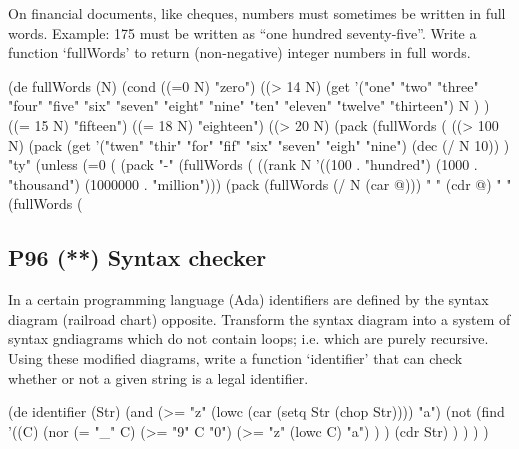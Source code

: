 On financial documents, like cheques, numbers must sometimes be written
in full words. Example: 175 must be written as ``one hundred
seventy-five''. Write a function `fullWords' to return (non-negative)
integer numbers in full words.

\begin{wideverbatim}

(de fullWords (N)
   (cond
      ((=0 N) "zero")
      ((> 14 N)
         (get
         '("one" "two" "three" "four" "five" "six" "seven" "eight"
         "nine" "ten" "eleven" "twelve" "thirteen")
            N ) )
      ((= 15 N) "fifteen")
      ((= 18 N) "eighteen")
      ((> 20 N) (pack (fullWords (%
      ((> 100 N)
         (pack
            (get
               '("twen" "thir" "for" "fif" "six" "seven" "eigh" "nine")
               (dec (/ N 10)) )
            "ty"
            (unless (=0 (%
               (pack "-" (fullWords (%
      ((rank N '((100 . "hundred") (1000 . "thousand") (1000000 . "million")))
         (pack (fullWords (/ N (car @))) " " (cdr @) " " (fullWords (%

\end{wideverbatim}

\pagebreak{}
\subsection*{{P96} (**) Syntax checker}
\label{sec:99-problems-P96}


In a certain programming language (Ada) identifiers are defined by the
syntax diagram (railroad chart) opposite. Transform the syntax diagram
into a system of syntax gndiagrams which do not contain loops; i.e.
which are purely recursive. Using these modified diagrams, write a
function `identifier' that can check whether or not a given string is
a legal identifier.

\begin{wideverbatim}

(de identifier (Str)
   (and
      (>= "z" (lowc (car (setq Str (chop Str)))) "a")
      (not
         (find
            '((C)
               (nor
                  (= "_" C)
                  (>= "9" C "0")
                  (>= "z" (lowc C) "a") ) )
            (cdr Str) ) ) ) )

\end{wideverbatim}


